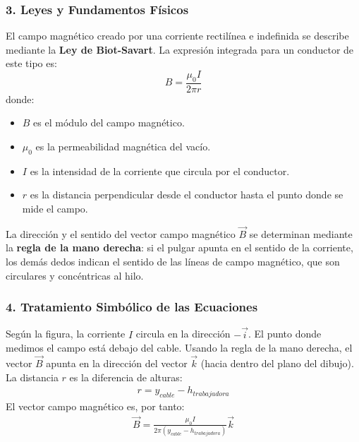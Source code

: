 \subsubsection*{3. Leyes y Fundamentos Físicos}
El campo magnético creado por una corriente rectilínea e indefinida se describe mediante la \textbf{Ley de Biot-Savart}. La expresión integrada para un conductor de este tipo es:
$$ B = \frac{\mu_0 I}{2\pi r} $$
donde:
\begin{itemize}
    \item $B$ es el módulo del campo magnético.
    \item $\mu_0$ es la permeabilidad magnética del vacío.
    \item $I$ es la intensidad de la corriente que circula por el conductor.
    \item $r$ es la distancia perpendicular desde el conductor hasta el punto donde se mide el campo.
\end{itemize}
La dirección y el sentido del vector campo magnético $\vec{B}$ se determinan mediante la \textbf{regla de la mano derecha}: si el pulgar apunta en el sentido de la corriente, los demás dedos indican el sentido de las líneas de campo magnético, que son circulares y concéntricas al hilo.

\subsubsection*{4. Tratamiento Simbólico de las Ecuaciones}
Según la figura, la corriente $I$ circula en la dirección $-\vec{i}$. El punto donde medimos el campo está debajo del cable. Usando la regla de la mano derecha, el vector $\vec{B}$ apunta en la dirección del vector $\vec{k}$ (hacia dentro del plano del dibujo).
La distancia $r$ es la diferencia de alturas:
\begin{gather}
    r = y_{cable} - h_{trabajadora}
\end{gather}
El vector campo magnético es, por tanto:
\begin{gather}
    \vec{B} = \frac{\mu_0 I}{2\pi (y_{cable} - h_{trabajadora})} \vec{k}
\end{gather}

